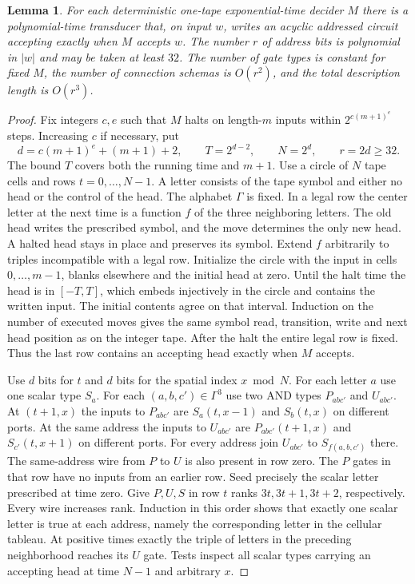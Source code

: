 \documentclass[11pt]{article}
\newtheorem{lemma}[theorem]{Lemma}
\theoremstyle{definition}
\theoremstyle{remark}
\numberwithin{equation}{section}
\begin{document}
\begin{lemma}
\label{lem:machine-schemas}
For each deterministic one-tape exponential-time decider $M$ there is a
polynomial-time transducer that, on input $w$, writes an acyclic
addressed circuit accepting exactly when $M$ accepts $w$. The number
$r$ of address bits is polynomial in $|w|$ and may be taken at least
$32$. The number of gate types is constant for fixed $M$, the number of
connection schemas is $O(r^2)$, and the total description length is
$O(r^3)$.
\end{lemma}
\begin{proof}
Fix integers $c,e$ such that $M$ halts on length-$m$ inputs within
$2^{c(m+1)^e}$ steps. Increasing $c$ if necessary, put
\[
 d=c(m+1)^e+(m+1)+2,\qquad T=2^{d-2},\qquad N=2^d,\qquad r=2d\ge32 .
\]
The bound $T$ covers both the running time and $m+1$.
Use a circle of $N$ tape cells and rows $t=0,\ldots,N-1$. A letter
consists of the tape symbol and either no head or the control of the
head. The alphabet $\Gamma$ is fixed. In a legal row the center letter
at the next time is a function $f$ of the three neighboring letters.
The old head writes the prescribed symbol, and the move determines the
only new head. A halted head stays in place and preserves its symbol.
Extend $f$ arbitrarily to triples incompatible with a legal row.
Initialize the circle with the input in cells $0,\ldots,m-1$,
blanks elsewhere and the initial head at zero. Until the halt time
the head is in $[-T,T]$, which embeds injectively in the circle and
contains the written input. The initial contents agree on that interval.
Induction on the number of executed moves gives the same symbol read,
transition, write and next head position as on the integer tape.
After the halt the entire legal row is fixed. Thus the last row
contains an accepting head exactly when $M$ accepts.

Use $d$ bits for $t$ and $d$ bits for the spatial index $x\bmod N$.
For each letter $a$ use one scalar type $S_a$. For each
$(a,b,c')\in\Gamma^3$ use two AND types $P_{abc'}$ and $U_{abc'}$.
At $(t+1,x)$ the inputs to $P_{abc'}$ are
$S_a(t,x-1)$ and $S_b(t,x)$ on different ports.
At the same address the inputs to $U_{abc'}$ are $P_{abc'}(t+1,x)$
and $S_{c'}(t,x+1)$ on different ports.
For every address join $U_{abc'}$ to $S_{f(a,b,c')}$ there.
The same-address wire from $P$ to $U$ is also present in row zero.
The $P$ gates in that row have no inputs from an earlier row.
Seed precisely the scalar letter prescribed at time zero.
Give $P,U,S$ in row $t$ ranks $3t,3t+1,3t+2$, respectively.
Every wire increases rank. Induction in this order shows that exactly
one scalar letter is true at each address, namely the corresponding
letter in the cellular tableau. At positive times exactly the triple
of letters in the preceding neighborhood reaches its $U$ gate.
Tests inspect all scalar types carrying an accepting head at time
$N-1$ and arbitrary $x$.


\end{proof}
\end{document}
